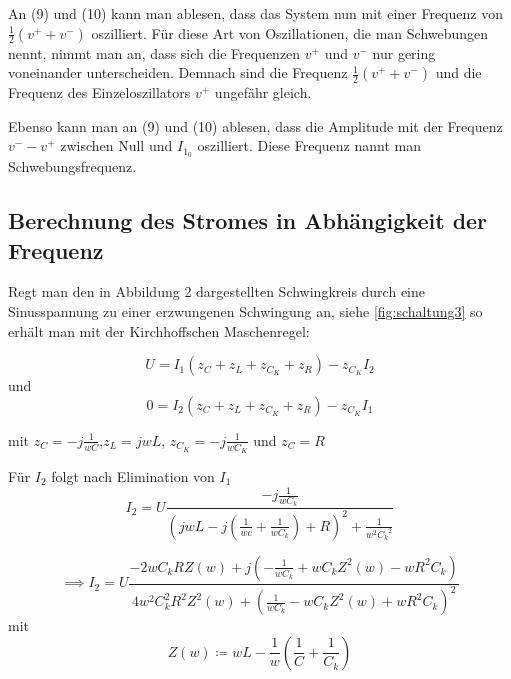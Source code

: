 An (9) und (10) kann man ablesen, dass das System nun mit einer Frequenz von $ \frac{1}{2} (v^{+} + v^{-}) $ oszilliert. Für diese Art von Oszillationen, die man Schwebungen nennt,
nimmt man an, dass sich die Frequenzen $ v^{+} $ und $ v^{-} $ nur gering voneinander unterscheiden. Demnach sind die Frequenz $ \frac{1}{2} (v^{+} + v^{-}) $ und
die Frequenz des Einzeloszillators $ v^{+} $ ungefähr gleich.

Ebenso kann man an (9) und (10) ablesen, dass die Amplitude mit der Frequenz $ v^{-} - v^{+} $ zwischen Null und $ I_{1_0} $ oszilliert. Diese Frequenz nannt man Schwebungsfrequenz.

\subsection{Berechnung des Stromes in Abhängigkeit der Frequenz}
Regt man den in Abbildung 2 dargestellten Schwingkreis durch eine Sinusspannung zu einer erzwungenen Schwingung an, siehe \autoref{fig:schaltung3}   
so erhält man mit der Kirchhoffschen Maschenregel:






\begin{equation}
    U = I_1 (z_C + z_L + z_{C_K} + z_R) - z_{C_K} I_2
    \label{eqn:Elf}
\end{equation}
und
\begin{equation}
    0 = I_2 (z_C + z_L + z_{C_K} + z_R) - z_{C_K} I_1
    \label{eqn:Zwoelf}
\end{equation}

mit $z_C = -j \frac{1}{wC}$,$z_L = jwL$, $z_{C_K} = -j \frac{1}{wC_K}$  und  $z_C = R$



Für $I_2$ folgt nach Elimination von $I_1$
\begin{equation}
    I_2 = U \frac{-j\frac{1}{wC_k}}{(jwL - j(\frac{1}{wc} + \frac{1}{wC_k})+R)^2 + \frac{1}{w^2 {C_k}^2}}
\end{equation}

\begin{equation}
    \implies I_2 = U \frac{ -2wC_kRZ(w) + j(- \frac{1}{wC_k} + wC_kZ^2(w) - wR^2C_k) }{ 4w^2C_k^2R^2Z^2(w) + ( \frac{1}{wC_k} - wC_kZ^2(w) + wR^2C_k )^2 }
\end{equation} 
mit
\begin{equation}
    Z(w) \coloneq wL - \frac{1}{w} (\frac{1}{C} + \frac{1}{C_k})
\end{equation}

